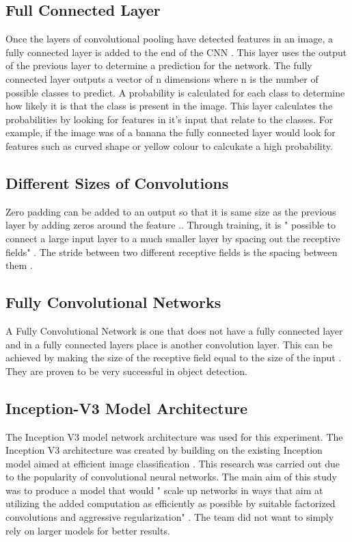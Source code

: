 \tocless\subsection{Full Connected Layer}
Once the layers of convolutional pooling have detected features in an image, a fully connected layer is added to the end of the CNN \parencite{fullyConnectedLayer}.
This layer uses the output of the previous layer to determine a prediction for the network.
The fully connected layer outputs a vector of n dimensions where n is the number of possible classes to predict.
A probability is calculated for each class to determine how likely it is that the class is present in the image.
This layer calculates the probabilities by looking for features in it's input that relate to the classes.
For example, if the image was of a banana the fully connected layer would look for features such as curved shape or yellow colour to calcukate a high probability.

\tocless\subsection{Different Sizes of Convolutions}
Zero padding can be added to an output so that it is same size as the previous layer by adding zeros around the feature \parencite{handsOnML}..
Through training, it is " possible to connect a large input layer to a much smaller layer by spacing out the receptive fields" \parencite{handsOnML}.
The stride between two different receptive fields is the spacing between them \parencite{handsOnML}.

\tocless\subsection{Fully Convolutional Networks}
A Fully Convolutional Network is one that does not have a fully connected layer
and in a fully connected layers place is another convolution layer.
This can be achieved by making the size of the receptive field equal to the size of the input \parencite{digits}.
They are proven to be very successful in object detection.

\tocless\subsection{Inception-V3 Model Architecture}
The Inception V3 model network architecture was used for this experiment. The
Inception V3 architecture was created by building on the existing Inception
model aimed at efficient image classification \parencite{rethinkingInception}.
This research was carried out due to the popularity of convolutional neural networks.
The main aim of this study was to produce a model that would " scale up networks in ways that aim at utilizing the added computation as efficiently as possible by suitable factorized convolutions and aggressive regularization" \parencite{rethinkingInception}.
The team did not want to simply rely on larger models for better results.

